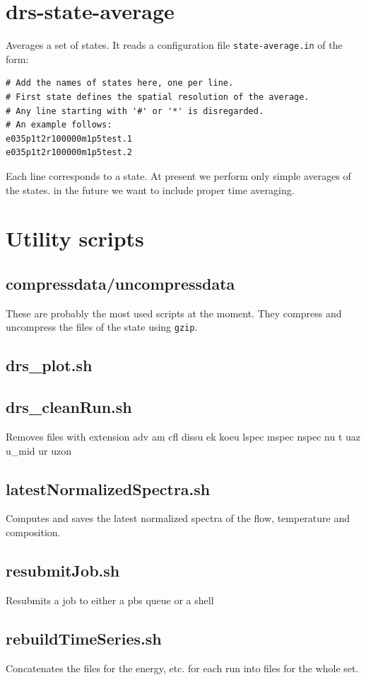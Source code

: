 \documentclass[a4paper,10pt]{book}
\begin{document}
\section{drs-state-average}
Averages a set of states. It reads a configuration file \verb|state-average.in|
of the form:
\begin{verbatim}
# Add the names of states here, one per line.
# First state defines the spatial resolution of the average.
# Any line starting with '#' or '*' is disregarded.
# An example follows:
e035p1t2r100000m1p5test.1
e035p1t2r100000m1p5test.2
\end{verbatim}
Each line corresponds to a state. At present we perform only simple averages of
the states. in the future we want to include proper time averaging.

\section{Utility scripts}
\subsection{compressdata/uncompressdata}
These are probably the most used scripts at the moment. They compress and
uncompress the files of the state using \verb|gzip|.
\subsection{drs\_plot.sh}

\subsection{drs\_cleanRun.sh}
Removes files with extension adv am cfl dissu ek koeu lspec mspec nspec nu t uaz u\_mid ur uzon
\subsection{latestNormalizedSpectra.sh}
Computes and saves the latest normalized spectra of the flow, temperature and composition.
\subsection{resubmitJob.sh}
Resubmits a job to either a pbs queue or a shell
\subsection{rebuildTimeSeries.sh}
Concatenates the files for the energy, etc. for each run into files for the whole set.
\end{document}
